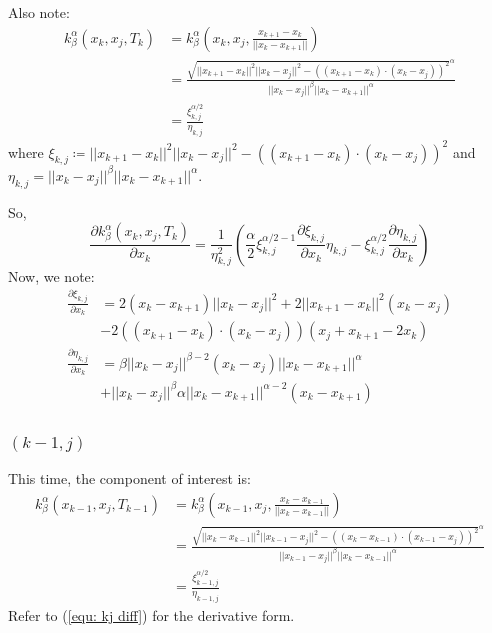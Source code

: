 \documentclass[a4paper, 11pt]{article}
\newcommand{\norm}[1]{||#1||}
\theoremstyle{definition}
\theoremstyle{remark}
\begin{document}
Also note:
\begin{align}
    k_{\beta}^{\alpha} \left( x_k, x_j, T_k \right) &= k_{\beta}^{\alpha} \left( x_k, x_j, \frac{x_{k+1} - x_{k}}{\norm{x_{k} - x_{k+1}}} \right)
    \\
    &= \frac{\sqrt{\norm{x_{k+1} - x_k}^2 \norm{x_k - x_j}^2- \left( \left( x_{k+1} - x_{k} \right) \cdot \left( x_{k} - x_{j} \right) \right)^2}^{\alpha} }{\norm{x_k - x_j}^{\beta} \norm{x_k - x_{k+1}}^{\alpha}} \\
    &= \frac{\xi_{k,j}^{\alpha/2}}{\eta_{k,j}}
\end{align}
where $\xi_{k,j} \coloneqq \norm{x_{k+1} - x_k}^2 \norm{x_k - x_j}^2- \left( \left( x_{k+1} - x_{k} \right) \cdot \left( x_{k} - x_{j} \right) \right)^2$ and $\eta_{k,j} = \norm{x_k -x_j}^{\beta} \norm{x_k - x_{k+1}}^{\alpha}$.

So,
\begin{equation}
    \frac{\partial k_{\beta}^{\alpha} \left( x_k, x_j, T_k \right)}{\partial x_k} =
\frac{1}{\eta_{k,j}^{2}} \left( \frac{\alpha}{2} \xi_{k,j}^{\alpha/2 - 1} \frac{\partial \xi_{k,j}}{\partial x_k} \eta_{k,j} - \xi_{k,j}^{\alpha/2} \frac{\partial \eta_{k,j}}{\partial x_k} \right)
\label{equ: kj diff}
\end{equation}
Now, we note:
\begin{align}
    \frac{\partial \xi_{k,j}}{\partial x_k} &= 2\left( x_k - x_{k+1} \right) \norm{x_k - x_j}^2 + 2 \norm{x_{k+1} - x_k}^2 (x_k - x_j) \nonumber \\
    & -2 \left( \left( x_{k+1} - x_k \right) \cdot \left( x_k - x_j \right) \right) \left( x_j + x_{k+1} - 2 x_k \right) \\
    \frac{\partial \eta_{k,j}}{\partial x_k} &= \beta \norm{x_k - x_j}^{\beta - 2} (x_k - x_j) \norm{x_k - x_{k+1}}^{\alpha} \\
    &+ \norm{x_k - x_j}^{\beta} \alpha \norm{x_k - x_{k+1}}^{\alpha - 2} (x_k - x_{k+1})
\end{align}

\subsubsection{$(k-1, j)$}
This time, the component of interest is:
\begin{align}
    k_{\beta}^{\alpha} \left( x_{k-1}, x_j, T_{k-1} \right) &= k_{\beta}^{\alpha} \left( x_{k-1}, x_j, \frac{x_k - x_{k-1}}{\norm{x_k - x_{k-1}}} \right) \\
    &= \frac{\sqrt{\norm{x_{k} - x_{k-1}}^2 \norm{x_{k-1} - x_j}^2- \left( \left( x_{k} - x_{k-1} \right) \cdot \left( x_{k-1} - x_{j} \right) \right)^2}^{\alpha} }{\norm{x_{k-1} - x_j}^{\beta} \norm{x_k - x_{k-1}}^{\alpha}} \\
    &= \frac{\xi_{k-1,j}^{\alpha/2}}{\eta_{k-1,j}}
\end{align}
Refer to (\ref{equ: kj diff}) for the derivative form.
\end{document}
